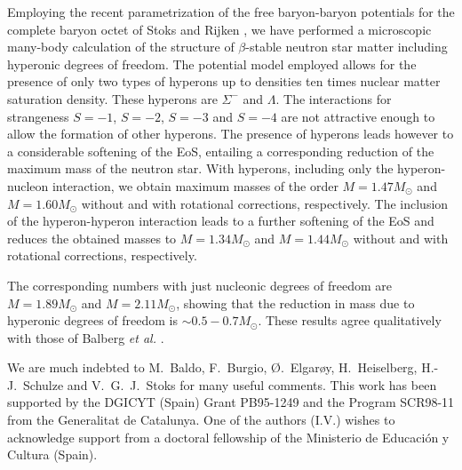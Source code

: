 Employing the recent 
parametrization
of the free baryon-baryon potentials
for the complete  baryon octet
of Stoks and Rijken \cite{sr99}, we have performed a
microscopic many-body calculation of the structure of
$\beta$-stable neutron star matter including 
hyperonic degrees of freedom. 
The potential model employed allows for the presence of only two
types of hyperons up to densities ten times nuclear matter
saturation density. These hyperons are
$\Sigma^-$ and $\Lambda$. The interactions for strangeness
$S=-1$, $S=-2$, $S=-3$ and $S=-4$ are not attractive enough to allow
the formation of other hyperons. The presence of hyperons leads however
to a considerable softening of the EoS, entailing a corresponding reduction
of the maximum mass of the neutron star. With hyperons, including only
the hyperon-nucleon interaction, we obtain maximum
masses of the order $M=1.47M_\odot$ and $M=1.60 M_\odot$ without and 
with rotational corrections, respectively.
The inclusion of the hyperon-hyperon interaction leads to a
further softening of the EoS and
reduces the obtained masses to 
$M=1.34M_\odot$ and $M=1.44 M_\odot$ without and 
with rotational corrections, respectively.

The corresponding numbers with just nucleonic degrees of freedom are
$M=1.89 M_\odot$ and $M=2.11 M_\odot$, showing that the 
reduction in mass due to hyperonic degrees of freedom is 
$\sim 0.5-0.7M_\odot$. These results agree qualitatively with those
of Balberg {\em et al.} \cite{blc99}.


We are much indebted to M.~Baldo, F.~Burgio, \O.~Elgar\o y, 
H.~Heiselberg, H.-J.~Schulze 
and V.~G.~J.~Stoks for many useful comments.
This work has been supported by the DGICYT (Spain) Grant PB95-1249 and
the Program SCR98-11 from the Generalitat de Catalunya. One of the authors
(I.V.) wishes to acknowledge support from a doctoral fellowship of the
Ministerio de Educaci\'on y Cultura (Spain). 

